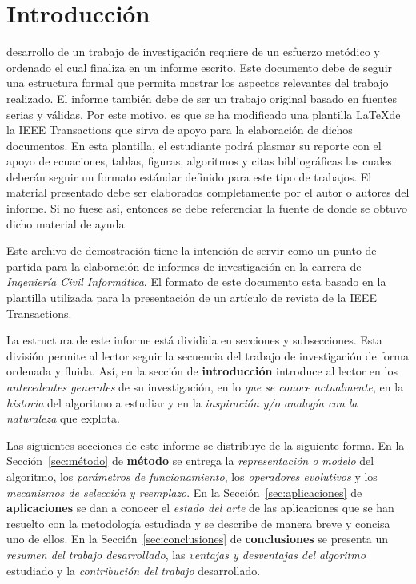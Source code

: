 \documentclass[journal]{IEEEtran}
\begin{document}
\section{Introducción} \label{sec:introduccion}
 desarrollo de un trabajo de investigación requiere de un esfuerzo metódico y ordenado el cual finaliza en un informe escrito. Este documento debe de seguir una estructura formal que permita mostrar los aspectos relevantes del trabajo realizado. El informe también debe de ser un trabajo original basado en fuentes serias y válidas. Por este motivo, es que se ha modificado una plantilla \LaTeX de la IEEE Transactions que sirva de apoyo para la elaboración de dichos documentos. En esta plantilla, el estudiante podrá plasmar su reporte con el apoyo de ecuaciones, tablas, figuras, algoritmos y citas bibliográficas las cuales deberán seguir un formato estándar definido para este tipo de trabajos. El material presentado debe ser elaborados completamente por el autor o autores del informe. Si no fuese así, entonces se debe referenciar la fuente de donde se obtuvo dicho material de ayuda.

Este archivo de demostración tiene la intención de servir como un punto de partida para la elaboración de informes de investigación en la carrera de \emph{Ingeniería Civil Informática}. El formato de este documento esta basado en la plantilla utilizada para la presentación de un artículo de revista de la IEEE Transactions.

La estructura de este informe está dividida en secciones y subsecciones. Esta división permite al lector seguir la secuencia del trabajo de investigación de forma ordenada y fluida. Así, en la sección de \textbf{introducción} introduce al lector en los \textit{antecedentes generales} de su investigación, en lo\textit{ que se conoce actualmente}, en la \textit{historia} del algoritmo a estudiar y en la \textit{inspiración y/o analogía con la naturaleza} que explota. 

Las siguientes secciones de este informe se distribuye de la siguiente forma. En la Sección~\ref{sec:método} de \textbf{método} se entrega la \textit{representación o modelo} del algoritmo, los \textit{parámetros de funcionamiento}, los \textit{operadores evolutivos} y los \textit{mecanismos de selección y reemplazo}. En la Sección~\ref{sec:aplicaciones} de \textbf{aplicaciones} se dan a conocer el \textit{estado del arte} de las aplicaciones que se han resuelto con la metodología estudiada y se describe de manera breve y concisa uno de ellos. En la Sección~\ref{sec:conclusiones} de \textbf{conclusiones} se presenta un \textit{resumen del trabajo desarrollado}, las\textit{ ventajas y desventajas del algoritmo} estudiado y la \textit{contribución del trabajo} desarrollado.
\end{document}
